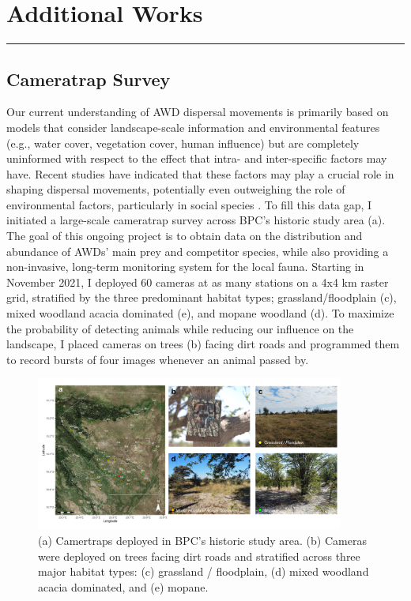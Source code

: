 \documentclass[../FinalThesis.tex]{subfiles}
\begin{document}
\setcounter{chapter}{-1}
\chapter{Additional Works}
\renewcommand{\thechapter}{A}
\thispagestyle{empty}
\vspace{-1cm}
\noindent\hfil\rule{0.75\textwidth}{.4pt}\hfil

\newpage
\section{Cameratrap Survey}
\label{CameratrapSurvey}

Our current understanding of AWD dispersal movements is primarily based on
models that consider landscape-scale information and environmental features
(e.g., water cover, vegetation cover, human influence) but are completely
uninformed with respect to the effect that intra- and inter-specific factors may
have. Recent studies have indicated that these factors may play a crucial role
in shaping dispersal movements, potentially even outweighing the role of
environmental factors, particularly in social species \citep{Cozzi.2018,
Armansin.2020}. To fill this data gap, I initiated a large-scale cameratrap
survey across BPC's historic study area (a). The goal of this
ongoing project is to obtain data on the distribution and abundance of AWDs'
main prey and competitor species, while also providing a non-invasive, long-term
monitoring system for the local fauna. Starting in November 2021, I deployed 60
cameras at as many stations on a 4x4 km raster grid, stratified by the three
predominant habitat types; grassland/floodplain (c), mixed
woodland acacia dominated (e), and mopane woodland
(d). To maximize the probability of detecting animals while
reducing our influence on the landscape, I placed cameras on trees
(b) facing dirt roads and programmed them to record bursts of four
images whenever an animal passed by.

\begin{figure}[htpb]
\begin{center}
  \includegraphics[width = 0.9\textwidth]{Figures/Cameras}
  \caption{(a) Camertraps deployed in BPC's historic study area. (b) Cameras
  were deployed on trees facing dirt roads and stratified across three major
  habitat types: (c) grassland / floodplain, (d) mixed woodland acacia
  dominated, and (e) mopane.}
  \label{Cameras}
\end{center}
\end{figure}
\end{document}
